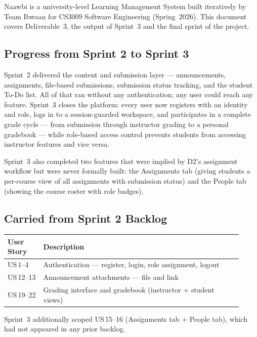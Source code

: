 \documentclass[12pt, a4paper]{article}
\begin{document}
Naawbi is a university-level Learning Management System built iteratively by
Team Ibwaan for CS3009 Software Engineering (Spring~2026). This document covers
Deliverable~3, the output of Sprint~3 and the final sprint of the project.

\subsection{Progress from Sprint 2 to Sprint 3}

Sprint~2 delivered the content and submission layer --- announcements,
assignments, file-based submissions, submission status tracking, and the
student To-Do list. All of that ran without any authentication; any user could
reach any feature. Sprint~3 closes the platform: every user now registers with
an identity and role, logs in to a session-guarded workspace, and participates
in a complete grade cycle --- from submission through instructor grading to a
personal gradebook --- while role-based access control prevents students from
accessing instructor features and vice versa.

Sprint~3 also completed two features that were implied by D2's assignment
workflow but were never formally built: the Assignments tab (giving students a
per-course view of all assignments with submission status) and the People tab
(showing the course roster with role badges).

\subsection{Carried from Sprint 2 Backlog}

\begin{center}
\begin{tabular}{@{}p{0.14\linewidth}p{0.78\linewidth}@{}}
  \toprule
  \textbf{User Story} & \textbf{Description} \\
  \midrule
  US\,1--4   & Authentication --- register, login, role assignment, logout \\
US\,12--13 & Announcement attachments --- file and link \\
  US\,19--22 & Grading interface and gradebook (instructor + student views) \\
  \bottomrule
\end{tabular}
\end{center}

\noindent Sprint~3 additionally scoped US\,15--16 (Assignments tab + People
tab), which had not appeared in any prior backlog.
\end{document}
